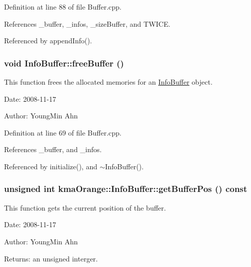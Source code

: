 Definition at line 88 of file Buffer.cpp.

References \_\-buffer, \_\-infos, \_\-sizeBuffer, and TWICE.

Referenced by appendInfo().\hypertarget{classkmaOrange_1_1InfoBuffer_b68630dc3da3bc27c8b6d2304745449b}{
\subsubsection[{freeBuffer}]{\setlength{\rightskip}{0pt plus 5cm}void InfoBuffer::freeBuffer ()}}
\label{classkmaOrange_1_1InfoBuffer_b68630dc3da3bc27c8b6d2304745449b}


This function frees the allocated memories for an \hyperlink{classkmaOrange_1_1InfoBuffer}{InfoBuffer} object. 

\begin{Desc}
\item[Date:]2008-11-17 \end{Desc}
\begin{Desc}
\item[Author:]YoungMin Ahn \end{Desc}


Definition at line 69 of file Buffer.cpp.

References \_\-buffer, and \_\-infos.

Referenced by initialize(), and $\sim$InfoBuffer().\hypertarget{classkmaOrange_1_1InfoBuffer_3939b3c0cc62f4d21fda540e1a6b2142}{
\subsubsection[{getBufferPos}]{\setlength{\rightskip}{0pt plus 5cm}unsigned int kmaOrange::InfoBuffer::getBufferPos () const}}
\label{classkmaOrange_1_1InfoBuffer_3939b3c0cc62f4d21fda540e1a6b2142}


This function gets the current position of the buffer. 

\begin{Desc}
\item[Date:]2008-11-17 \end{Desc}
\begin{Desc}
\item[Author:]YoungMin Ahn \end{Desc}
\begin{Desc}
\item[Returns:]an unsigned interger. \end{Desc}


